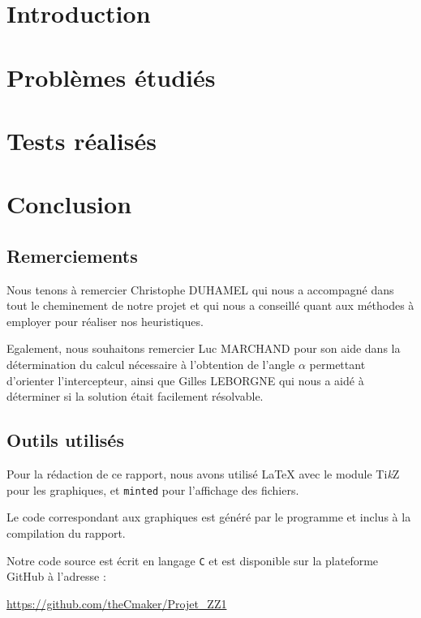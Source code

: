 \documentclass{report}
\newcommand{\TikZ}{Ti{\color{orange}\textit{k}}Z}
\newcommand{\blankpage}{\newpage \thispagestyle{empty} \addtocounter{page}{-1} \null \newpage}
\begin{document}
  
  \setlength{\parskip}{10pt}
  \setlength{\parindent}{0pt}
  \tableofcontents

  \chapter{Introduction}
    
  
  \chapter{Problèmes étudiés}
    
  
  \chapter{Tests réalisés}
    
  
  \chapter{Conclusion}
    
  
  \section*{Remerciements}
    Nous tenons à remercier Christophe DUHAMEL qui nous a accompagné dans tout le cheminement de notre projet et qui nous a conseillé quant aux méthodes à employer pour réaliser nos heuristiques.

    Egalement, nous souhaitons remercier Luc MARCHAND pour son aide dans la détermination du calcul nécessaire à l'obtention de l'angle $\alpha$ permettant d'orienter l'intercepteur, ainsi que Gilles LEBORGNE qui nous a aidé à déterminer si la solution était facilement résolvable.

  \section*{Outils utilisés}
    Pour la rédaction de ce rapport, nous avons utilisé \LaTeX{} avec le module \TikZ{} pour les graphiques, et \texttt{minted} pour l'affichage des fichiers.

    Le code correspondant aux graphiques est généré par le programme et inclus à la compilation du rapport.

    Notre code source est écrit en langage \texttt{C} et est disponible sur la plateforme GitHub à l'adresse :
    \begin{center}
      \href{https://github.com/theCmaker/Projet\_ZZ1}{https://github.com/theCmaker/Projet\_ZZ1}
    \end{center}

  \listoffigures
  \listoftables
  \begingroup
    \let\clearpage\relax
    \listoflistings
  \endgroup
\end{document}
